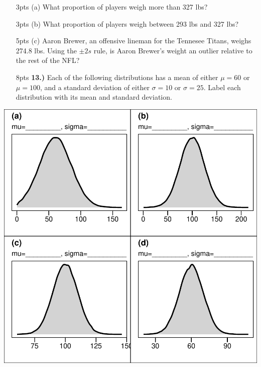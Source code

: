 \documentclass[
]{article}
\begin{document}
\begin{enumerate}
\item[3pts (a)]{What proportion of players weigh more than 327 lbs?}
\item[]
\item[]
\item[]
\item[]
\item[3pts (b)]{What proportion of players weigh between 293 lbs and 327 lbs?}
\item[]
\item[]
\item[]
\item[]
\item[5pts (c)]{Aaron Brewer, an offensive lineman for the Tennesee Titans, weighs 274.8 lbs. Using the $\pm 2s$ rule, is Aaron Brewer's weight an outlier relative to the rest of the NFL?}
\item[]
\item[]
\item[]
\item[]
\end{enumerate}

\newpage
\begin{enumerate}
\item[8pts \bf 13.)]{Each of the following distributions has a mean of either $\mu = 60$ or $\mu = 100$, and a standard deviation of either $\sigma = 10$ or $\sigma = 25$. Label each distribution with its mean and standard deviation.}
\end{enumerate}

\includegraphics{Exam_1_Version_A_files/figure-latex/unnamed-chunk-3-1.pdf}
\end{document}
